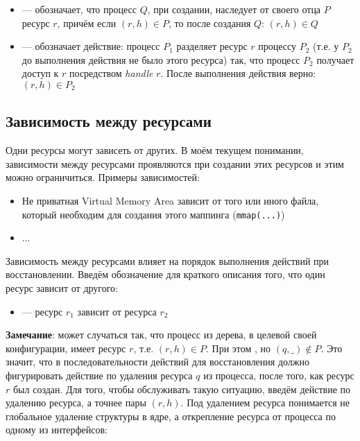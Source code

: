 \begin{itemize}
	\item {} --- обозначает, что процесс $Q$, при создании, наследует от своего отца $P$ ресурс $r$, причём если $(r, h) \in P$, то после создания $Q$: $(r, h) \in Q$
	\item {} --- обозначает действие: процесс $P_1$ разделяет ресурс $r$ процессу $P_2$ (т.е. у $P_2$ до выполнения действия не было этого ресурса) так, что процесс $P_2$ получает доступ к $r$ посредством \textit{handle} $r$. После выполнения действия верно: $(r, h) \in P_2$
\end{itemize}

\subsection{Зависимость между ресурсами}

Одни ресурсы могут зависеть от других. В моём текущем понимании, зависимости между ресурсами проявляются при создании этих ресурсов и этим можно ограничиться. Примеры зависимостей:

\begin{itemize}
	\item Не приватная Virtual Memory Area зависит от того или иного файла, который необходим для создания этого маппинга (\texttt{mmap(...)})
	\item ...
\end{itemize}

Зависимость между ресурсами влияет на порядок выполнения действий при восстановлении. Введём обозначение для краткого описания того, что один ресурс зависит от другого:

\begin{itemize}
	\item {} --- ресурс $r_1$ зависит от ресурса $r_2$
\end{itemize}

\textbf{Замечание}: может случаться так, что процесс из дерева, в целевой своей конфигурации, имеет ресурс $r$, т.е. $(r, h) \in P$. При этом , но $(q, \_) \notin P$. Это значит, что в последовательности действий для восстановления должно фигурировать действие по удаления ресурса $q$ из процесса, после того, как ресурс $r$ был создан. Для того, чтобы обслуживать такую ситуацию, введём действие по удалению ресурса, а точнее пары $(r, h)$. Под удалением ресурса понимается не глобальное удаление структуры в ядре, а открепление ресурса от процесса по одному из интерфейсов:

